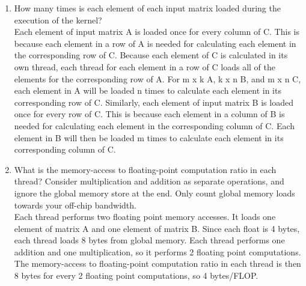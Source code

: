 \documentclass{article}
\begin{document}
\begin{enumerate}
	\item How many times is each element of each input matrix loaded during the execution of the kernel? \\
	
	Each element of input matrix A is loaded once for every column of C. This is because each element in a row of A is needed for calculating each element in the corresponding row of C. Because each element of C is calculated in its own thread, each thread for each element in a row of C loads all of the elements for the corresponding row of A. For m x k A, k x n B, and m x n C, each element in A will be loaded n times to calculate each element in its corresponding row of C. Similarly, each element of input matrix B is loaded once for every row of C. This is because each element in a column of B is needed for calculating each element in the corresponding column of C. Each element in B will then be loaded m times to calculate each element in its corresponding column of C.\\
	
	\item What is the memory-access to floating-point computation ratio in each thread? Consider multiplication and addition as separate
	operations, and ignore the global memory store at the end. Only count global memory loads towards your off-chip bandwidth. \\
	
    Each thread performs two floating point memory accesses. It loads one element of matrix A and one element of matrix B. Since each float is 4 bytes, each thread loads 8 bytes from global memory. Each thread performs one addition and one multiplication, so it performs 2 floating point computations. The memory-access to floating-point computation ratio in each thread is then 8 bytes for every 2 floating point computations, so 4 bytes/FLOP.\\
\end{enumerate}
\end{document}
